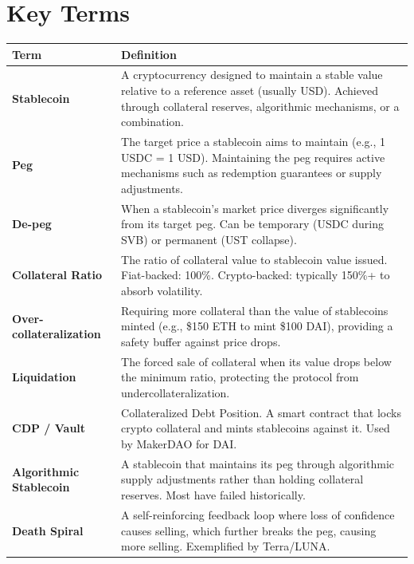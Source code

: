 \documentclass[11pt,a4paper]{article}
\begin{document}
\vspace{4pt}

\section{Key Terms}

\renewcommand{\arraystretch}{1.25}
\noindent\begin{tabular}{@{}p{3.2cm}p{11.4cm}@{}}
\toprule
\textbf{Term} & \textbf{Definition} \\
\midrule
\textbf{Stablecoin}               & A cryptocurrency designed to maintain a stable value relative to a reference asset (usually USD). Achieved through collateral reserves, algorithmic mechanisms, or a combination. \\
\textbf{Peg}                      & The target price a stablecoin aims to maintain (e.g., 1 USDC = 1 USD). Maintaining the peg requires active mechanisms such as redemption guarantees or supply adjustments. \\
\textbf{De-peg}                   & When a stablecoin's market price diverges significantly from its target peg. Can be temporary (USDC during SVB) or permanent (UST collapse). \\
\textbf{Collateral Ratio}         & The ratio of collateral value to stablecoin value issued. Fiat-backed: 100\%. Crypto-backed: typically 150\%+ to absorb volatility. \\
\textbf{Over-collateralization}   & Requiring more collateral than the value of stablecoins minted (e.g., \$150 ETH to mint \$100 DAI), providing a safety buffer against price drops. \\
\textbf{Liquidation}              & The forced sale of collateral when its value drops below the minimum ratio, protecting the protocol from undercollateralization. \\
\textbf{CDP / Vault}              & Collateralized Debt Position. A smart contract that locks crypto collateral and mints stablecoins against it. Used by MakerDAO for DAI. \\
\textbf{Algorithmic Stablecoin}   & A stablecoin that maintains its peg through algorithmic supply adjustments rather than holding collateral reserves. Most have failed historically. \\
\textbf{Death Spiral}             & A self-reinforcing feedback loop where loss of confidence causes selling, which further breaks the peg, causing more selling. Exemplified by Terra/LUNA. \\

\end{tabular}
\end{document}
